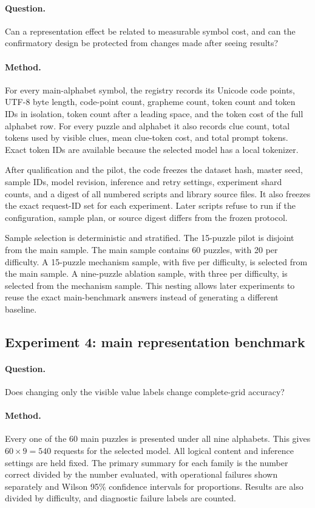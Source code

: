 \documentclass[11pt,a4paper]{article}
\begin{document}
\paragraph{Question.}
Can a representation effect be related to measurable symbol cost, and can the confirmatory design be protected from changes made after seeing results?

\paragraph{Method.}
For every main-alphabet symbol, the registry records its Unicode code points, UTF-8 byte length, code-point count, grapheme count, token count and token IDs in isolation, token count after a leading space, and the token cost of the full alphabet row.  For every puzzle and alphabet it also records clue count, total tokens used by visible clues, mean clue-token cost, and total prompt tokens.  Exact token IDs are available because the selected model has a local tokenizer.

After qualification and the pilot, the code freezes the dataset hash, master seed, sample IDs, model revision, inference and retry settings, experiment shard counts, and a digest of all numbered scripts and library source files.  It also freezes the exact request-ID set for each experiment.  Later scripts refuse to run if the configuration, sample plan, or source digest differs from the frozen protocol.

Sample selection is deterministic and stratified.  The 15-puzzle pilot is disjoint from the main sample.  The main sample contains 60 puzzles, with 20 per difficulty.  A 15-puzzle mechanism sample, with five per difficulty, is selected from the main sample.  A nine-puzzle ablation sample, with three per difficulty, is selected from the mechanism sample.  This nesting allows later experiments to reuse the exact main-benchmark answers instead of generating a different baseline.

\subsection{Experiment 4: main representation benchmark}
\paragraph{Question.}
Does changing only the visible value labels change complete-grid accuracy?

\paragraph{Method.}
Every one of the 60 main puzzles is presented under all nine alphabets.  This gives $60\times9=540$ requests for the selected model.  All logical content and inference settings are held fixed.  The primary summary for each family is the number correct divided by the number evaluated, with operational failures shown separately and Wilson 95\% confidence intervals for proportions.  Results are also divided by difficulty, and diagnostic failure labels are counted.
\end{document}
